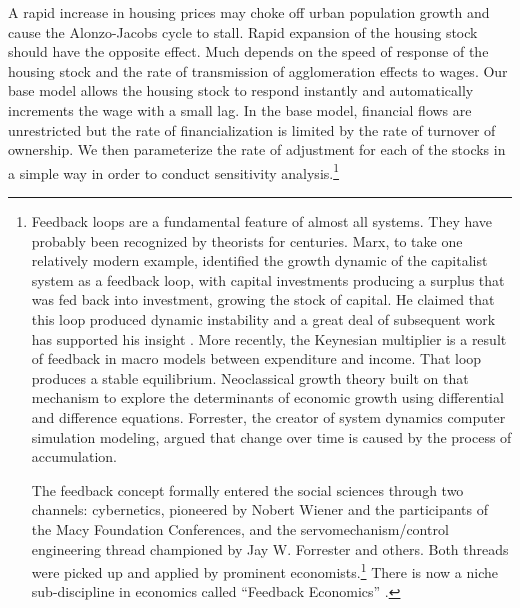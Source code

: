 A rapid increase in housing prices may choke off urban population growth and cause the \Gls{Alonzo-Jacobs cycle} to stall. Rapid expansion of the housing stock should have the opposite effect. Much depends on the speed of response of the housing stock and the rate of transmission of agglomeration effects to wages. Our base model allows the housing stock to respond instantly and automatically increments the wage with a small lag. In the base model, financial flows are unrestricted but the rate of financialization is limited by the rate of turnover of ownership. We then parameterize the rate of adjustment for each of the stocks in a simple way in order to conduct sensitivity analysis.\footnote{Feedback loops are a fundamental feature of almost all systems. They have probably been recognized by theorists for centuries. Marx, to take one relatively modern example, identified the growth dynamic of the capitalist system  as a feedback loop, with capital investments producing a surplus that was fed back into investment, growing the stock of capital. He  claimed that this loop produced dynamic instability and a great deal of subsequent work has supported his insight \cite{dumenilStabilityInstabilityDynamic1986} \cite{schumpeterInstabilityCapitalism1928}. More recently, the Keynesian multiplier is a result of feedback in macro models between expenditure and income. That loop produces a stable equilibrium. Neoclassical growth theory built on that mechanism to explore the determinants of economic growth using differential and difference equations. Forrester, the creator of system dynamics computer simulation modeling, argued that change over time is caused by the process of accumulation.

The feedback concept formally entered the social sciences through two channels: cybernetics, pioneered by Nobert Wiener  and the participants of the Macy Foundation Conferences, and the servomechanism/control engineering thread championed by Jay W. Forrester and others. Both threads were picked up and applied by prominent economists.\footnote{Richardson \cite{richardsonFeedbackThoughtSocial1991} mentions Oscar Lange (1970), Kenneth Boulding, and Alfred Eichner, Phillips,  R. G. D. Allen (1956), and Axel Leijonhufvud.} There is now a niche sub-discipline in economics called ``Feedback Economics'' \cite{radzickiIntroductionFeedbackEconomics, cavanaFeedbackEconomicsEconomic2021}. %
}


